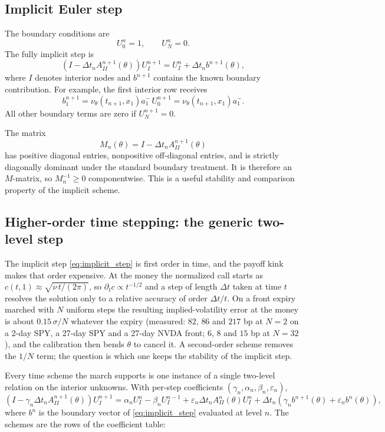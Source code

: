 \documentclass[11pt]{article}
\newcommand{\1}{\mathbf{1}}
\newcommand{\vloc}{\nu}
\begin{document}
\subsection{Implicit Euler step}

The boundary conditions are
\[
  U_0^n=1,\qquad U_N^n=0.
\]
The fully implicit step is
\begin{equation}
  \left(I-\Delta t_n A^{n+1}_{II}(\theta)\right)U_I^{n+1}
  =
  U_I^n+\Delta t_n b^{n+1}(\theta),
  \label{eq:implicit_step}
\end{equation}
where $I$ denotes interior nodes and $b^{n+1}$ contains the known boundary contribution.
For example, the first interior row receives
\[
  b^{n+1}_1=\vloc_\theta(t_{n+1},x_1)a_1^-\,U_0^{n+1}
          =\vloc_\theta(t_{n+1},x_1)a_1^-.
\]
All other boundary terms are zero if $U_N^{n+1}=0$.

The matrix
\[
  M_n(\theta)=I-\Delta t_n A^{n+1}_{II}(\theta)
\]
has positive diagonal entries, nonpositive off-diagonal entries, and is strictly
diagonally dominant under the standard boundary treatment. It is therefore an
$M$-matrix, so $M_n^{-1}\ge0$ componentwise. This is a useful stability and comparison
property of the implicit scheme.

\subsection{Higher-order time stepping: the generic two-level step}

The implicit step \eqref{eq:implicit_step} is first order in time, and the payoff kink
makes that order expensive. At the money the normalized call starts as
$c(t,1)\approx\sqrt{\vloc\,t/(2\pi)}$, so $\partial_tc\propto t^{-1/2}$ and a step of
length $\Delta t$ taken at time $t$ resolves the solution only to a relative accuracy of
order $\Delta t/t$. On a front expiry marched with $N$ uniform steps the resulting
implied-volatility error at the money is about $0.15\,\sigma/N$ whatever the expiry
(measured: $82$, $86$ and $217$ bp at $N=2$ on a 2-day SPY, a 27-day SPY and a 27-day
NVDA front; $6$, $8$ and $15$ bp at $N=32$), and the calibration then bends $\theta$ to
cancel it. A second-order scheme removes the $1/N$ term; the question is which one keeps
the stability of the implicit step.

Every time scheme the march supports is one instance of a single two-level relation on
the interior unknowns. With per-step coefficients
$(\gamma_n,\alpha_n,\beta_n,\varepsilon_n)$,
\begin{equation}
  \left(I-\gamma_n\Delta t_n A^{n+1}_{II}(\theta)\right)U_I^{n+1}
  =
  \alpha_n U_I^n-\beta_n U_I^{n-1}
  +\varepsilon_n\Delta t_n A^{n}_{II}(\theta)U_I^n
  +\Delta t_n\left(\gamma_n b^{n+1}(\theta)+\varepsilon_n b^{n}(\theta)\right),
  \label{eq:generic_two_level_step}
\end{equation}
where $b^{n}$ is the boundary vector of \eqref{eq:implicit_step} evaluated at level $n$.
The schemes are the rows of the coefficient table:
\end{document}
